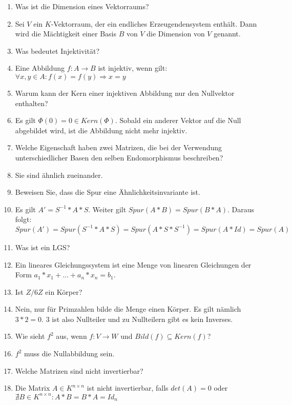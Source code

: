 \documentclass[11pt,parskip=full]{scrartcl}
\newcommand{\answer}{\item[\textbf{Antwort}]}
\begin{document}
\begin{enumerate}[label=\textbf{\arabic*. Frage}]
		\item Was ist die Dimension eines Vektorraums?
		\answer Sei $V$ ein $K$-Vektorraum, der ein endliches Erzeugendensystem enthält. Dann wird die Mächtigkeit einer Basis $B$ von $V$ die Dimension von $V$ genannt.
		
		\item Was bedeutet Injektivität?
		\answer Eine Abbildung \(f: A \rightarrow B\) ist injektiv, wenn gilt: \\
		\(\forall x, y \in A: f(x) = f(y) \Rightarrow x = y\)
		
		\item Warum kann der Kern einer injektiven Abbildung nur den Nullvektor enthalten?
		\answer Es gilt \(\Phi(0) = 0 \in Kern(\Phi)\). Sobald ein anderer Vektor auf die Null abgebildet wird, ist die Abbildung nicht mehr injektiv.
		
		\item Welche Eigenschaft haben zwei Matrizen, die bei der Verwendung unterschiedlicher Basen den selben Endomorphismus beschreiben?
		\answer Sie sind ähnlich zueinander.
		
		\item Beweisen Sie, dass die Spur eine Ähnlichkeitsinvariante ist.
		\answer Es gilt \(A' = S^{-1}*A*S\). Weiter gilt \(Spur(A*B) = Spur(B*A)\). Daraus folgt: \\
		\(Spur(A') = Spur(S^{-1} * A * S) = Spur(A*S*S^{-1}) = Spur(A*Id) = Spur(A)\)
		
		
		\item Was ist ein LGS?
		\answer Ein lineares Gleichungssystem ist eine Menge von linearen Gleichungen der Form \(a_{1}*x_{1} + ... + a_{n}*x_{n} = b_{1}\).
		
		\item Ist $Z/6Z$ ein Körper?
		\answer Nein, nur für Primzahlen bilde die Menge einen Körper. Es gilt nämlich \(3*2=0\). $3$ ist also Nullteiler und zu Nullteilern gibt es kein Inverses.
		
		\item Wie sieht $f^2$ aus, wenn $f: V \rightarrow W$ und $Bild(f) \subseteq Kern(f)$?
		\answer $f^2$ muss die Nullabbildung sein.
		
		\item Welche Matrizen sind nicht invertierbar?
		\answer Die Matrix \(A \in K^{n \times n}\) ist nicht invertierbar, falls \(det(A) = 0\) oder \(\nexists B \in K^{n \times n}: A*B = B*A = Id_{n}\)
		

\end{enumerate}
\end{document}
